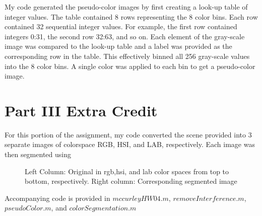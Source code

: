 \documentclass{article}[12 pt]
\begin{document}
\begin{enumerate}
My code generated the pseudo-color images by first creating a look-up table of  integer values.  The table contained 8 rows  representing the 8 color bins.  Each row contained 32 sequential integer values.  For example, the first row contained integers 0:31, the second row 32:63, and so on.  Each element of the gray-scale image was compared to the look-up table and a label was provided as the corresponding row in the table.   This effectively binned all 256 gray-scale values into the 8 color bins.  A single color was applied to each bin to get a pseudo-color image.
\end{enumerate}

\section*{Part III Extra Credit}
For this portion of the assignment, my code converted the scene provided into  3 separate images of colorspace RGB, HSI, and LAB, respectively. Each image was then segmented using 

\begin{figure}[H]
\captionsetup[subfloat]{labelformat=empty}
\centering
{}
\hspace{0mm}
\hspace{0mm}
\caption{Left Column: Original in rgb,hsi, and lab color spaces from top to bottom, respectively.  Right column: Corresponding segmented image}
\label{pc}
\end{figure}


 \noindent 
 Accompanying code is provided in $mccurleyHW04.m$, $removeInterference.m$, $pseudoColor.m$, and $colorSegmentation.m$
\end{document}
